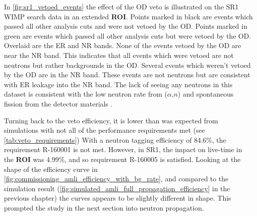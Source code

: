 
%



\par
In \autoref{fig:sr1_vetoed_events} the effect of the OD veto is illustrated on the SR1 WIMP search data in an extended \textbf{ROI}.
Points marked in black are events which passed all other analysis cuts and were not vetoed by the OD.
Points marked in green are events which passed all other analysis cuts but were vetoed by the OD.
Overlaid are the ER and NR bands.
None of the events vetoed by the OD are near the NR band.
This indicates that all events which were vetoed are not neutrons but rather backgrounds in the OD.
Several events which weren't vetoed by the OD are in the NR band.
These events are not neutrons but are consistent with ER leakage into the NR band.
The lack of seeing any neutrons in this dataset is consistent with the low neutron rate from ($\alpha$,$n$) and spontaneous fission from the detector materials \cite{LZ_TechnicalDesignReview_ref}.



\par
Turning back to the veto efficiency, it is lower than was expected from simulations with not all of the performance requirements met (see \autoref{tab:veto_requirements})
With a neutron tagging efficiency of 84.6\%, the requirement R-160001 is not met.
However, in SR1, the impact on live-time in the \textbf{ROI} was 4.99\%, and so requirement R-160005 is satisfied.
Looking at the shape of the efficiency curve in \autoref{fig:commissioning_amli_efficiency_with_bg_rate}, and compared to the simulation result (\autoref{fig:simulated_amli_full_propagation_efficiency} in the previous chapter) the curves appears to be slightly different in shape.
This prompted the study in the next section into neutron propagation.


